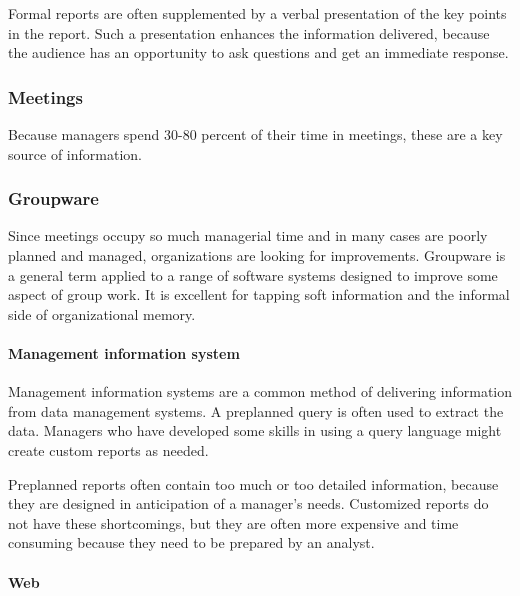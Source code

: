 \documentclass[
]{article}
\begin{document}
Formal reports are often supplemented by a verbal presentation of the
key points in the report. Such a presentation enhances the information
delivered, because the audience has an opportunity to ask questions and
get an immediate response.

\hypertarget{meetings}{%
\subsubsection*{Meetings}\label{meetings}}

Because managers spend 30-80 percent of their time in meetings, these
are a key source of information.

\hypertarget{groupware}{%
\subsubsection*{Groupware}\label{groupware}}

Since meetings occupy so much managerial time and in many cases are
poorly planned and managed, organizations are looking for improvements.
Groupware is a general term applied to a range of software systems
designed to improve some aspect of group work. It is excellent for
tapping soft information and the informal side of organizational memory.

\hypertarget{management-information-system}{%
\paragraph*{Management information system}\label{management-information-system}}

Management information systems are a common method of delivering
information from data management systems. A preplanned query is often
used to extract the data. Managers who have developed some skills in
using a query language might create custom reports as needed.

Preplanned reports often contain too much or too detailed information,
because they are designed in anticipation of a manager's needs.
Customized reports do not have these shortcomings, but they are often
more expensive and time consuming because they need to be prepared by an
analyst.

\hypertarget{web}{%
\paragraph*{Web}\label{web}}
\end{document}
